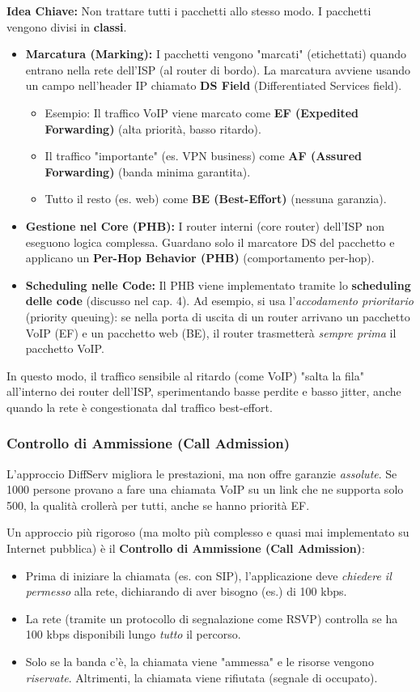 \textbf{Idea Chiave:} Non trattare tutti i pacchetti allo stesso modo. I pacchetti vengono divisi in \textbf{classi}.
\begin{itemize}
    \item \textbf{Marcatura (Marking):} I pacchetti vengono "marcati" (etichettati) quando entrano nella rete dell'ISP (al router di bordo). La marcatura avviene usando un campo nell'header IP chiamato \textbf{DS Field} (Differentiated Services field).
        \begin{itemize}
            \item Esempio: Il traffico VoIP viene marcato come \textbf{EF (Expedited Forwarding)} (alta priorità, basso ritardo).
            \item Il traffico "importante" (es. VPN business) come \textbf{AF (Assured Forwarding)} (banda minima garantita).
            \item Tutto il resto (es. web) come \textbf{BE (Best-Effort)} (nessuna garanzia).
        \end{itemize}
    \item \textbf{Gestione nel Core (PHB):} I router interni (core router) dell'ISP non eseguono logica complessa. Guardano solo il marcatore DS del pacchetto e applicano un \textbf{Per-Hop Behavior (PHB)} (comportamento per-hop).
    \item \textbf{Scheduling nelle Code:} Il PHB viene implementato tramite lo \textbf{scheduling delle code} (discusso nel cap. 4). Ad esempio, si usa l'\textit{accodamento prioritario} (priority queuing): se nella porta di uscita di un router arrivano un pacchetto VoIP (EF) e un pacchetto web (BE), il router trasmetterà \textit{sempre prima} il pacchetto VoIP.
\end{itemize}
In questo modo, il traffico sensibile al ritardo (come VoIP) "salta la fila" all'interno dei router dell'ISP, sperimentando basse perdite e basso jitter, anche quando la rete è congestionata dal traffico best-effort.

\subsubsection{Controllo di Ammissione (Call Admission)}
L'approccio DiffServ migliora le prestazioni, ma non offre garanzie \textit{assolute}. Se 1000 persone provano a fare una chiamata VoIP su un link che ne supporta solo 500, la qualità crollerà per tutti, anche se hanno priorità EF.

Un approccio più rigoroso (ma molto più complesso e quasi mai implementato su Internet pubblica) è il \textbf{Controllo di Ammissione (Call Admission)}:
\begin{itemize}
    \item Prima di iniziare la chiamata (es. con SIP), l'applicazione deve \textit{chiedere il permesso} alla rete, dichiarando di aver bisogno (es.) di 100 kbps.
    \item La rete (tramite un protocollo di segnalazione come RSVP) controlla se ha 100 kbps disponibili lungo \textit{tutto} il percorso.
    \item Solo se la banda c'è, la chiamata viene "ammessa" e le risorse vengono \textit{riservate}. Altrimenti, la chiamata viene rifiutata (segnale di occupato).
\end{itemize}
